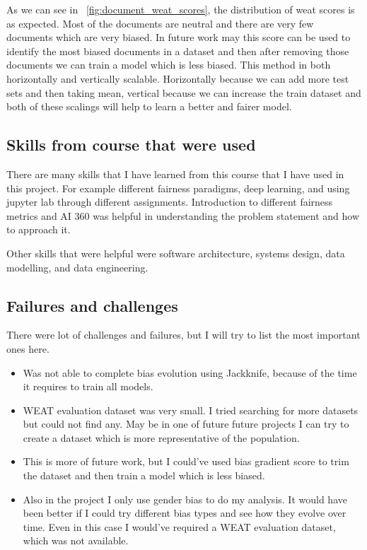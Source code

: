 \documentclass{article}
\begin{document}
As we can see in ~\ref{fig:document_weat_scores}, the distribution of weat scores is as expected. Most of the documents are neutral and there are very few documents which are very biased. In future work may this score can be used to identify the most biased documents in a dataset and then after removing those documents we can train a model which is less biased. This method in both horizontally and vertically scalable. Horizontally because we can add more test sets and then taking mean, vertical because we can increase the train dataset and both of these scalings will help to learn a better and fairer model.

\subsection{Skills from course that were used}

There are many skills that I have learned from this course that I have used in this project. For example different fairness paradigms, deep learning, and using jupyter lab through different assignments. Introduction to different fairness metrics and AI 360 was helpful in understanding the problem statement and how to approach it.

Other skills that were helpful were software architecture, systems design, data modelling, and data engineering.

\subsection{Failures and challenges}

 There were lot of challenges and failures, but I will try to list the most important ones here.
\begin{itemize}
    \item Was not able to complete bias evolution using Jackknife, because of the time it requires to train all models.
    \item WEAT evaluation dataset was very small. I tried searching for more datasets but could not find any. May be in one of future future projects I can try to create a dataset which is more representative of the population.
    \item This is more of future work, but I could've used bias gradient score to trim the dataset and then train a model which is less biased.
    \item Also in the project I only use gender bias to do my analysis. It would have been better if I could try different bias types and see how they evolve over time. Even in this case I would've required a WEAT evaluation dataset, which was not available.
\end{itemize}
\end{document}
